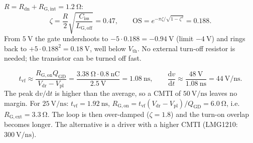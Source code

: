 
\begin{solutionblock}
	$R=R_\mathrm{dn}+R_\mathrm{G,int}=\SI{1.2}{\ohm}$:
	\begin{equation}
		\zeta=\frac{R}{2}\sqrt{\frac{C_\mathrm{iss}}{L_\mathrm{G,off}}}=0.47,\qquad
		\mathrm{OS}=e^{-\pi\zeta/\sqrt{1-\zeta^2}}=0.188.
	\end{equation}
	From $\SI{5}{\volt}$ the gate undershoots to $-5\cdot0.188=\SI{-0.94}{\volt}$ (limit $\SI{-4}{\volt}$) and rings back to $+5\cdot0.188^2=\SI{0.18}{\volt}$, well below $V_\mathrm{th}$. No external turn-off resistor is needed; the transistor can be turned off fast.
\end{solutionblock}


\begin{solutionblock}
	\begin{equation}
		t_\mathrm{vf}\approx\frac{R_\mathrm{G,on}Q_\mathrm{GD}}{V_\mathrm{dr}-V_\mathrm{pl}}=\frac{\SI{3.38}{\ohm}\cdot\SI{0.8}{\nano\coulomb}}{\SI{2.5}{\volt}}=\SI{1.08}{\nano\second},\qquad
		\frac{\mathrm{d}v}{\mathrm{d}t}\approx\frac{\SI{48}{\volt}}{\SI{1.08}{\nano\second}}=\SI{44}{\volt\per\nano\second}.
	\end{equation}
	The peak $\mathrm{d}v/\mathrm{d}t$ is higher than the average, so a CMTI of $\SI{50}{\volt\per\nano\second}$ leaves no margin. For $\SI{25}{\volt\per\nano\second}$: $t_\mathrm{vf}=\SI{1.92}{\nano\second}$, $R_\mathrm{G,on}=t_\mathrm{vf}(V_\mathrm{dr}-V_\mathrm{pl})/Q_\mathrm{GD}=\SI{6.0}{\ohm}$, i.e.\ $R_\mathrm{G,ext}=\SI{3.3}{\ohm}$. The loop is then over-damped ($\zeta=1.8$) and the turn-on overlap becomes longer. The alternative is a driver with a higher CMTI (LMG1210: $\SI{300}{\volt\per\nano\second}$).
\end{solutionblock}



